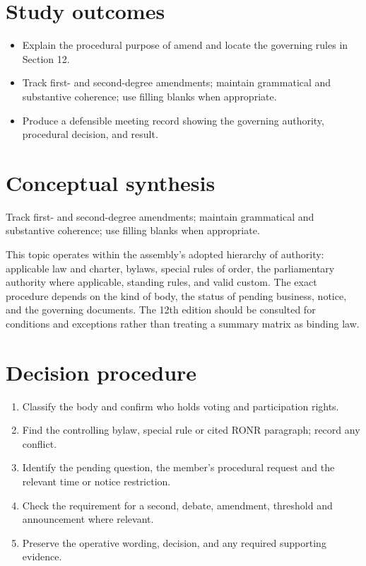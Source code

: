 \documentclass[11pt]{article}
\begin{document}
\SuiteOpen
{}
\section{Study outcomes}
\begin{itemize}[leftmargin=*,itemsep=4pt]
\item Explain the procedural purpose of amend and locate the governing rules in Section 12.
\item Track first- and second-degree amendments; maintain grammatical and substantive coherence; use filling blanks when appropriate.
\item Produce a defensible meeting record showing the governing authority, procedural decision, and result.
\end{itemize}

\section{Conceptual synthesis}
Track first- and second-degree amendments; maintain grammatical and substantive coherence; use filling blanks when appropriate.

This topic operates within the assembly’s adopted hierarchy of authority: applicable law and charter, bylaws, special rules of order, the parliamentary authority where applicable, standing rules, and valid custom. The exact procedure depends on the kind of body, the status of pending business, notice, and the governing documents. The 12th edition should be consulted for conditions and exceptions rather than treating a summary matrix as binding law.
\section{Decision procedure}
\begin{enumerate}[leftmargin=*,itemsep=4pt]
\item Classify the body and confirm who holds voting and participation rights.
\item Find the controlling bylaw, special rule or cited RONR paragraph; record any conflict.
\item Identify the pending question, the member’s procedural request and the relevant time or notice restriction.
\item Check the requirement for a second, debate, amendment, threshold and announcement where relevant.
\item Preserve the operative wording, decision, and any required supporting evidence.
\end{enumerate}
\end{document}
